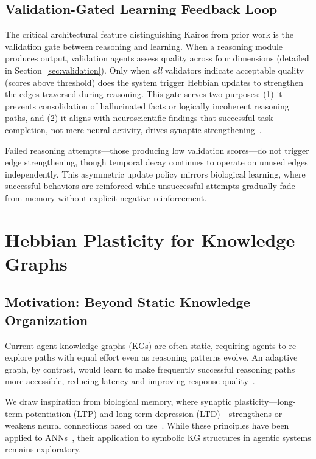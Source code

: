 \documentclass{article}
\begin{document}
\subsection{Validation-Gated Learning Feedback Loop}

The critical architectural feature distinguishing Kairos from prior work is the validation gate between reasoning and learning. When a reasoning module produces output, validation agents assess quality across four dimensions (detailed in Section~\ref{sec:validation}). Only when \textit{all} validators indicate acceptable quality (scores above threshold) does the system trigger Hebbian updates to strengthen the edges traversed during reasoning. This gate serves two purposes: (1) it prevents consolidation of hallucinated facts or logically incoherent reasoning paths, and (2) it aligns with neuroscientific findings that successful task completion, not mere neural activity, drives synaptic strengthening~\citep{squire2015memory}.

Failed reasoning attempts—those producing low validation scores—do not trigger edge strengthening, though temporal decay continues to operate on unused edges independently. This asymmetric update policy mirrors biological learning, where successful behaviors are reinforced while unsuccessful attempts gradually fade from memory without explicit negative reinforcement.

\section{Hebbian Plasticity for Knowledge Graphs}
\label{sec:hebbian}

\subsection{Motivation: Beyond Static Knowledge Organization}

Current agent knowledge graphs (KGs) are often static, requiring agents to re-explore paths with equal effort even as reasoning patterns evolve. An adaptive graph, by contrast, would learn to make frequently successful reasoning paths more accessible, reducing latency and improving response quality~\citep{packer2023memgpt}.

We draw inspiration from biological memory, where synaptic plasticity—long-term potentiation (LTP) and long-term depression (LTD)—strengthens or weakens neural connections based on use~\citep{hebb1949organization,squire2015memory}. While these principles have been applied to ANNs~\citep{mvil2024hebbian}, their application to symbolic KG structures in agentic systems remains exploratory.
\end{document}
